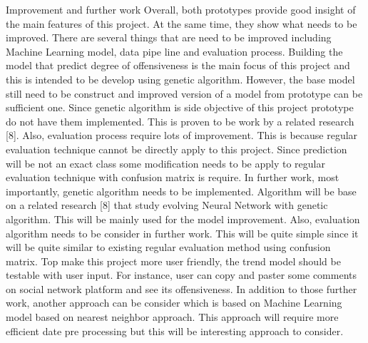 \documentclass[12pt, natbib=false]{article}
\begin{document}
Improvement and further work
Overall, both prototypes provide good insight of the main features of this project. At the same time, they show what needs to be improved. There are several things that are need to be improved including Machine Learning model, data pipe line and evaluation process. Building the model that predict degree of offensiveness is the main focus of this project and this is intended to be develop using genetic algorithm. However, the base model still need to be construct and improved version of a model from prototype can be sufficient one. Since genetic algorithm is side objective of this project prototype do not have them implemented. This is proven to be work by a related research [8]. Also, evaluation process require lots of improvement. This is because regular evaluation technique cannot be directly apply to this project. Since prediction will be not an exact class some modification needs to be apply to regular evaluation technique with confusion matrix is require.
In further work, most importantly, genetic algorithm needs to be implemented. Algorithm will be base on a related research [8] that study evolving Neural Network with genetic algorithm. This will be mainly used for the model improvement. Also, evaluation algorithm needs to be consider in further work. This will be quite simple since it will be quite similar to existing regular evaluation method using confusion matrix. Top make this project more user friendly, the trend model should be testable with user input. For instance, user can copy and paster some comments on social network platform and see its offensiveness.  In addition to those further work, another approach can be consider which is based on Machine Learning model based on nearest neighbor approach. This approach will require more efficient date pre processing but this will be interesting approach to consider.


\printbibliography
\end{document}
